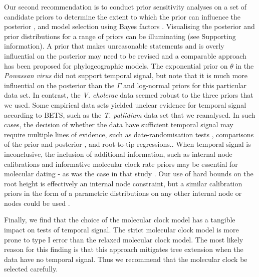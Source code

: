 \documentclass[10pt,letterpaper]{article}
\begin{document}
Our second recommendation is to conduct prior sensitivity analyses on a set of candidate priors to determine the extent to which the prior can influence the posterior \cite{foster2017evaluating, lopes2011confronting}, and model selection using Bayes factors \cite{lambert2018student}. Visualising the posterior and prior distributions for a range of priors can be illuminating (see Supporting information). A prior that makes unreasonable statements and is overly influential on the posterior may need to be revised {and a comparable approach has been proposed for phylogeographic models\cite{gao2023model, gao2023prioritree}}. The exponential prior on $\theta$ in the \textit{Powassan virus} did not support temporal signal, but note that it is much more influential on the posterior than the $\Gamma$ and log-normal priors for this particular data set. In contrast, the \textit{V. cholerae} data seemed robust to the three priors that we used. Some empirical data sets yielded unclear evidence for temporal signal according to BETS, such as the \textit{T. pallidium} data set that we reanalysed. In such cases, the decision of whether the data have sufficient temporal signal may require multiple lines of evidence, such as date-randomisation tests \cite{duchene2015performance, ramsden2009hantavirus}, comparisons of the prior and posterior \cite{duchene2020estimating}, and root-to-tip regressions.\cite{featherstone2023clockor2, rambaut2016exploring}. When temporal signal is inconclusive, the inclusion of additional information, such as internal node calibrations and informative molecular clock rate priors may be essential for molecular dating - as was the case in that study \cite{majander2020ancient}. {Our use of hard bounds on the root height is effectively an internal node constraint, but a similar calibration priors in the form of a parametric distributions on any other internal node or nodes could be used \cite{duchene2014impact, warnock2015calibration}.}

Finally, we find that the choice of the molecular clock model has a tangible impact on tests of temporal signal. The strict molecular clock model is more prone to type I error than the relaxed molecular clock model. The most likely reason for this finding is that this approach mitigates tree extension when the data have no temporal signal. Thus we recommend that the molecular clock be selected carefully.

\end{document}
